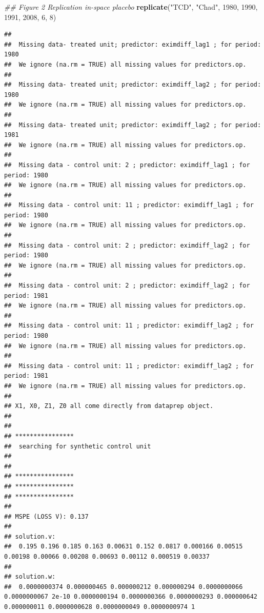 \documentclass[]{article}
\newenvironment{Shaded}{\begin{snugshade}}{\end{snugshade}}
\newcommand{\CommentTok}[1]{\textcolor[rgb]{0.56,0.35,0.01}{\textit{#1}}}
\newcommand{\DecValTok}[1]{\textcolor[rgb]{0.00,0.00,0.81}{#1}}
\newcommand{\KeywordTok}[1]{\textcolor[rgb]{0.13,0.29,0.53}{\textbf{#1}}}
\newcommand{\NormalTok}[1]{#1}
\newcommand{\StringTok}[1]{\textcolor[rgb]{0.31,0.60,0.02}{#1}}
\begin{document}
\begin{Shaded}
\begin{Highlighting}[]
\CommentTok{## Figure 2 Replication in-space placebo}
\KeywordTok{replicate}\NormalTok{(}\StringTok{"TCD"}\NormalTok{, }\StringTok{"Chad"}\NormalTok{, }\DecValTok{1980}\NormalTok{, }\DecValTok{1990}\NormalTok{, }\DecValTok{1991}\NormalTok{, }\DecValTok{2008}\NormalTok{, }\DecValTok{6}\NormalTok{, }\DecValTok{8}\NormalTok{)  }
\end{Highlighting}
\end{Shaded}

\begin{verbatim}
## 
##  Missing data- treated unit; predictor: eximdiff_lag1 ; for period: 1980 
##  We ignore (na.rm = TRUE) all missing values for predictors.op.
## 
##  Missing data- treated unit; predictor: eximdiff_lag2 ; for period: 1980 
##  We ignore (na.rm = TRUE) all missing values for predictors.op.
## 
##  Missing data- treated unit; predictor: eximdiff_lag2 ; for period: 1981 
##  We ignore (na.rm = TRUE) all missing values for predictors.op.
## 
##  Missing data - control unit: 2 ; predictor: eximdiff_lag1 ; for period: 1980 
##  We ignore (na.rm = TRUE) all missing values for predictors.op.
## 
##  Missing data - control unit: 11 ; predictor: eximdiff_lag1 ; for period: 1980 
##  We ignore (na.rm = TRUE) all missing values for predictors.op.
## 
##  Missing data - control unit: 2 ; predictor: eximdiff_lag2 ; for period: 1980 
##  We ignore (na.rm = TRUE) all missing values for predictors.op.
## 
##  Missing data - control unit: 2 ; predictor: eximdiff_lag2 ; for period: 1981 
##  We ignore (na.rm = TRUE) all missing values for predictors.op.
## 
##  Missing data - control unit: 11 ; predictor: eximdiff_lag2 ; for period: 1980 
##  We ignore (na.rm = TRUE) all missing values for predictors.op.
## 
##  Missing data - control unit: 11 ; predictor: eximdiff_lag2 ; for period: 1981 
##  We ignore (na.rm = TRUE) all missing values for predictors.op.
## 
## X1, X0, Z1, Z0 all come directly from dataprep object.
## 
## 
## **************** 
##  searching for synthetic control unit  
##  
## 
## **************** 
## **************** 
## **************** 
## 
## MSPE (LOSS V): 0.137 
## 
## solution.v:
##  0.195 0.196 0.185 0.163 0.00631 0.152 0.0817 0.000166 0.00515 0.00198 0.00066 0.00208 0.00693 0.00112 0.000519 0.00337 
## 
## solution.w:
##  0.0000000374 0.000000465 0.000000212 0.000000294 0.0000000066 0.0000000067 2e-10 0.0000000194 0.0000000366 0.0000000293 0.000000642 0.000000011 0.0000000628 0.0000000049 0.0000000974 1
\end{verbatim}
\end{document}
